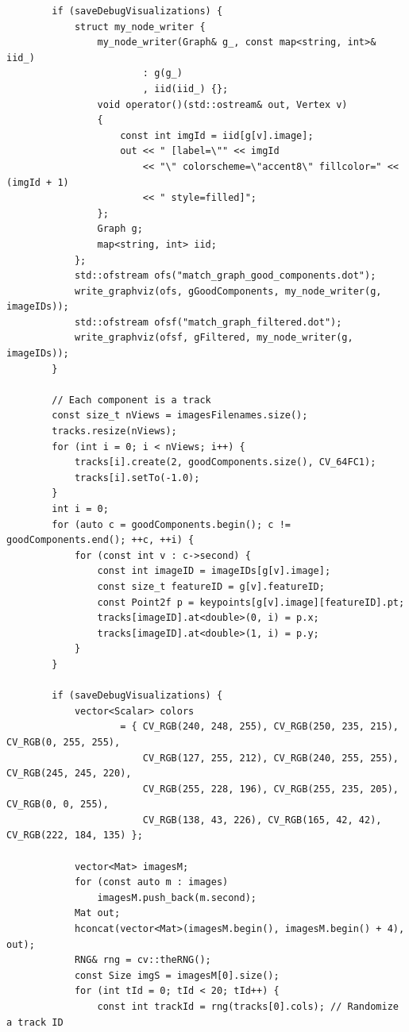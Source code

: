 \documentclass[a4paper, 12pt]{article}
\begin{document}
\begin{lstlisting}
        if (saveDebugVisualizations) {
            struct my_node_writer {
                my_node_writer(Graph& g_, const map<string, int>& iid_)
                        : g(g_)
                        , iid(iid_) {};
                void operator()(std::ostream& out, Vertex v)
                {
                    const int imgId = iid[g[v].image];
                    out << " [label=\"" << imgId
                        << "\" colorscheme=\"accent8\" fillcolor=" << (imgId + 1)
                        << " style=filled]";
                };
                Graph g;
                map<string, int> iid;
            };
            std::ofstream ofs("match_graph_good_components.dot");
            write_graphviz(ofs, gGoodComponents, my_node_writer(g, imageIDs));
            std::ofstream ofsf("match_graph_filtered.dot");
            write_graphviz(ofsf, gFiltered, my_node_writer(g, imageIDs));
        }

        // Each component is a track
        const size_t nViews = imagesFilenames.size();
        tracks.resize(nViews);
        for (int i = 0; i < nViews; i++) {
            tracks[i].create(2, goodComponents.size(), CV_64FC1);
            tracks[i].setTo(-1.0);
        }
        int i = 0;
        for (auto c = goodComponents.begin(); c != goodComponents.end(); ++c, ++i) {
            for (const int v : c->second) {
                const int imageID = imageIDs[g[v].image];
                const size_t featureID = g[v].featureID;
                const Point2f p = keypoints[g[v].image][featureID].pt;
                tracks[imageID].at<double>(0, i) = p.x;
                tracks[imageID].at<double>(1, i) = p.y;
            }
        }

        if (saveDebugVisualizations) {
            vector<Scalar> colors
                    = { CV_RGB(240, 248, 255), CV_RGB(250, 235, 215), CV_RGB(0, 255, 255),
                        CV_RGB(127, 255, 212), CV_RGB(240, 255, 255), CV_RGB(245, 245, 220),
                        CV_RGB(255, 228, 196), CV_RGB(255, 235, 205), CV_RGB(0, 0, 255),
                        CV_RGB(138, 43, 226), CV_RGB(165, 42, 42), CV_RGB(222, 184, 135) };

            vector<Mat> imagesM;
            for (const auto m : images)
                imagesM.push_back(m.second);
            Mat out;
            hconcat(vector<Mat>(imagesM.begin(), imagesM.begin() + 4), out);
            RNG& rng = cv::theRNG();
            const Size imgS = imagesM[0].size();
            for (int tId = 0; tId < 20; tId++) {
                const int trackId = rng(tracks[0].cols); // Randomize a track ID


\end{lstlisting}
\end{document}
